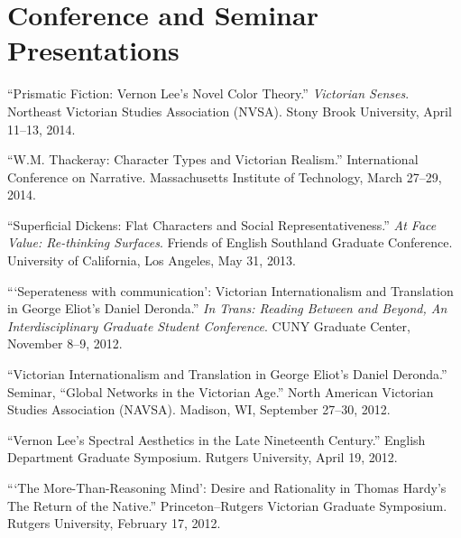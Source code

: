 \documentclass[10pt,letterpaper]{article}
\renewenvironment{itemize}{
  \begin{list}{}{
    \setlength{\leftmargin}{1.5em}
    \setlength{\itemsep}{0.25em}
    \setlength{\parskip}{0pt}
    \setlength{\parsep}{0.25em}
  }
}{
  \end{list}
}
\begin{document}


\section*{Conference and Seminar Presentations}

\begin{itemize}

\item ``Prismatic Fiction: Vernon Lee's Novel Color Theory.'' \emph{Victorian Senses}. Northeast Victorian Studies Association (NVSA). Stony Brook University, April 11--13, 2014.
\item ``W.M. Thackeray: Character Types and Victorian Realism.'' International Conference on Narrative. Massachusetts Institute of Technology, March 27--29, 2014.
\item ``Superficial Dickens: Flat Characters and Social Representativeness.'' \emph{At Face Value: Re-thinking Surfaces}. Friends of English Southland Graduate Conference. University of California, Los Angeles, May 31, 2013.
\item ```Seperateness with communication': Victorian Internationalism and Translation in George Eliot's Daniel Deronda.'' \emph{In Trans: Reading Between and Beyond, An Interdisciplinary Graduate Student Conference}. CUNY Graduate Center, November 8--9, 2012.
\item ``Victorian Internationalism and Translation in George Eliot's Daniel Deronda.'' Seminar, ``Global Networks in the Victorian Age.'' North American Victorian Studies Association (NAVSA). Madison, WI, September 27--30, 2012.
\item ``Vernon Lee's Spectral Aesthetics in the Late Nineteenth Century.'' English Department Graduate Symposium. Rutgers University, April 19, 2012.
\item ```The More-Than-Reasoning Mind': Desire and Rationality in Thomas Hardy's The Return of the Native.'' Princeton--Rutgers Victorian Graduate Symposium. Rutgers University, February 17, 2012.

\end{itemize}

\end{document}
